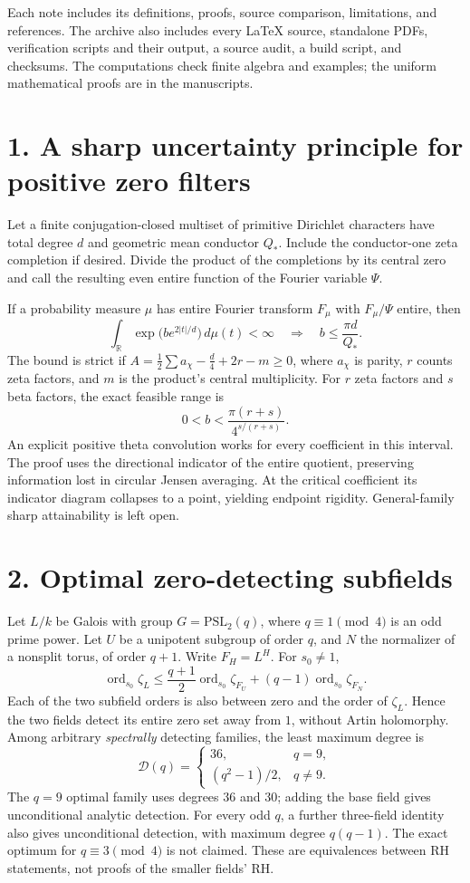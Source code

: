 \documentclass[11pt,a4paper]{article}
\begin{document}
Each note includes its definitions, proofs, source comparison, limitations, and references. The archive also includes every \LaTeX{} source, standalone PDFs, verification scripts and their output, a source audit, a build script, and checksums. The computations check finite algebra and examples; the uniform mathematical proofs are in the manuscripts.

\clearpage
\section*{1. A sharp uncertainty principle for positive zero filters}
Let a finite conjugation-closed multiset of primitive Dirichlet characters have total degree $d$ and geometric mean conductor $Q_*$. Include the conductor-one zeta completion if desired. Divide the product of the completions by its central zero and call the resulting even entire function of the Fourier variable $\Psi$.

If a probability measure $\mu$ has entire Fourier transform $F_\mu$ with $F_\mu/\Psi$ entire, then
\[
 \int_{\mathbb R}\exp\!\bigl(b e^{2|t|/d}\bigr)\,d\mu(t)<\infty
 \quad\Longrightarrow\quad b\le\frac{\pi d}{Q_*}.
\]
The bound is strict if $A=\frac12\sum a_\chi-\frac d4+2r-m\ge0$, where $a_\chi$ is parity, $r$ counts zeta factors, and $m$ is the product's central multiplicity. For $r$ zeta factors and $s$ beta factors, the exact feasible range is
\[
 0<b<\frac{\pi(r+s)}{4^{s/(r+s)}}.
\]
An explicit positive theta convolution works for every coefficient in this interval. The proof uses the directional indicator of the entire quotient, preserving information lost in circular Jensen averaging. At the critical coefficient its indicator diagram collapses to a point, yielding endpoint rigidity. General-family sharp attainability is left open.

\section*{2. Optimal zero-detecting subfields}
Let $L/k$ be Galois with group $G=\mathrm{PSL}_2(q)$, where $q\equiv1\pmod4$ is an odd prime power. Let $U$ be a unipotent subgroup of order $q$, and $N$ the normalizer of a nonsplit torus, of order $q+1$. Write $F_H=L^H$. For $s_0\ne1$,
\[
 \operatorname{ord}_{s_0}\zeta_L
 \le \frac{q+1}{2}\operatorname{ord}_{s_0}\zeta_{F_U}
 +(q-1)\operatorname{ord}_{s_0}\zeta_{F_N}.
\]
Each of the two subfield orders is also between zero and the order of $\zeta_L$. Hence the two fields detect its entire zero set away from $1$, without Artin holomorphy. Among arbitrary \emph{spectrally} detecting families, the least maximum degree is
\[
 \mathcal D(q)=\begin{cases}36,&q=9,\\(q^2-1)/2,&q\ne9.\end{cases}
\]
The $q=9$ optimal family uses degrees $36$ and $30$; adding the base field gives unconditional analytic detection. For every odd $q$, a further three-field identity also gives unconditional detection, with maximum degree $q(q-1)$. The exact optimum for $q\equiv3\pmod4$ is not claimed. These are equivalences between RH statements, not proofs of the smaller fields' RH.
\end{document}

